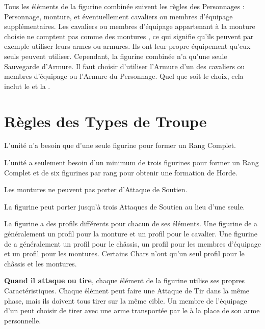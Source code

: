 Tous les éléments de la figurine combinée suivent les règles des Personnages : Personnage, monture, et éventuellement cavaliers ou membres d'équipage supplémentaires. Les cavaliers ou membres d'équipage appartenant à la monture choisie ne comptent pas comme des \og montures \fg{}, ce qui signifie qu'ils peuvent par exemple utiliser leurs armes ou armures. Ils ont leur propre équipement qu'eux seuls peuvent utiliser. Cependant, la figurine combinée n'a qu'une seule Sauvegarde d'Armure. Il faut choisir d'utiliser l'Armure d'un des cavaliers ou membres d'équipage ou l'Armure du Personnage. Quel que soit le choix, cela inclut le \barding{} et la \mountsprotection{}.

\section{Règles des Types de Troupe}

\noindent\textbf{\newfromWHB{\monsterranks}}

L'unité n'a besoin que d'une seule figurine pour former un Rang Complet.

\noindent\textbf{\monstrousranks}

L'unité a seulement besoin d'un minimum de trois figurines pour former un Rang Complet et de six figurines par rang pour obtenir une formation de Horde.

\noindent\textbf{\cavalrysupport}

Les montures ne peuvent pas porter d'Attaque de Soutien.

\noindent\textbf{\monstroussupport}

La figurine peut porter jusqu'à trois Attaques de Soutien au lieu d'une seule.

\newpage
\noindent\textbf{\combinedprofile}

La figurine a des profils différents pour chacun de ses éléments. Une figurine de \cavalry{} a généralement un profil pour la monture et un profil pour le cavalier. Une figurine de \chariot{} a généralement un profil pour le châssis, un profil pour les membres d'équipage et un profil pour les montures. Certains Chars n'ont qu'un seul profil pour le châssis et les montures.

\textbf{Quand il attaque ou tire}, chaque élément de la figurine utilise ses propres Caractéristiques. Chaque élément peut faire une Attaque de Tir dans la même phase, mais ils doivent tous tirer sur la même cible. Un membre de l'équipage d'un \chariot{} peut choisir de tirer avec une arme transportée par le \chariot{} à la place de son arme personnelle.

